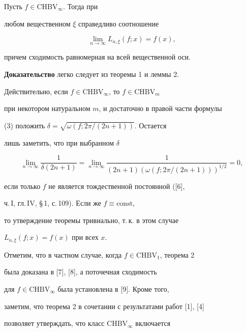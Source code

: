 \begin{thm}


Пусть $f\in \mathrm{CHBV}_{\infty}$. Тогда при


любом вещественном $\xi$ справедливо соотношение


$$


\lim\limits_{n\to\infty}L_{n,\xi}(f;x)=f(x),


$$


причем сходимость равномерная на всей вещественной оси.


\end{thm}





{\bf Доказательство} легко следует из теоремы 1 и леммы 2.





Действительно, если $f\in\mathrm{CHBV}_{\infty}$, то $f\in\mathrm{CHBV}_m$ 


при некотором натуральном $m$, и достаточно в правой части формулы


(3) положить $\delta=\sqrt{\omega(f;2\pi/(2n+1))}$. Остается


лишь заметить, что при выбранном $\delta$


$$


\lim\limits_{n\to\infty}\frac1{\delta(2n+1)}=\lim\limits_


{n\to\infty}\frac1{(2n+1)(\omega(f;2\pi/(2n+1)))^{1/2}}=0,


$$


если только $f$ не является тождественной постоянной ([6], 


ч.\,I, гл.\,IV, \S\,1, с.\,109). Если же $f\equiv\text{const}$,


то утверждение теоремы тривиально, т.\,к. в этом случае 


$L_{n,\xi}(f;x)=f(x)$ при всех $x$.





Отметим, что в частном случае, когда $f\in \mathrm{CHBV}_1$, теорема 2


была доказана в [7], [8], а поточечная сходимость


для $f\in \mathrm{CHBV}_{\infty}$ была установлена в [9]. Кроме того,


заметим, что теорема 2 в сочетании с результатами работ [1], [4]


позволяет утверждать, что класс $\mathrm{CHBV}_{\infty}$ включается


